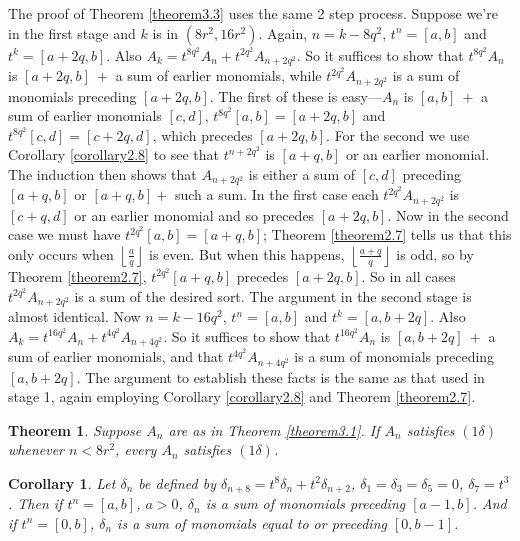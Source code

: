 \documentclass{monsky2009}
\newtheorem{theorem}[definition]{Theorem}
\newtheorem{corollary}[definition]{Corollary}
\begin{document}
The proof of Theorem \ref{theorem3.3} uses the same 2 step process. Suppose we're in the first stage and $k$ is in $(8r^{2}, 16r^{2})$. Again, $n=k-8q^{2}$, $t^{n}=[a,b]$ and $t^{k}=[a+2q, b]$. Also $A_{k}=t^{8q^{2}}A_{n} + t^{2q^{2}}A_{n+2q^{2}}$. So it suffices to show that $t^{8q^{2}}A_{n}$ is $[a+2q,b]\ +$ a sum of earlier monomials, while $t^{2q^{2}}A_{n+2q^{2}}$ is a sum of monomials preceding $[a+2q,b]$. The first of these is easy---$A_{n}$ is $[a,b]\ +$ a sum of earlier monomials $[c,d]$, $t^{8q^{2}}[a,b]=[a+2q,b]$ and $t^{8q^{2}}[c,d]=[c+2q,d]$, which precedes $[a+2q, b]$. For the second we use Corollary \ref{corollary2.8} to see that $t^{n+2q^{2}}$ is $[a+q,b]$ or an earlier monomial. The induction then shows that $A_{n+2q^{2}}$ is either a sum of $[c,d]$ preceding $[a+q,b]$ or $[a+q,b]+$ such a sum. In the first case each $t^{2q^{2}}A_{n+2q^{2}}$ is $[c+q,d]$ or an earlier monomial and so precedes $[a+2q,b]$. Now in the second case we must have $t^{2q^{2}}[a,b]=[a+q,b]$; Theorem \ref{theorem2.7} tells us that this only occurs when $\left\lfloor\frac{a}{q}\right\rfloor$ is even. But when this happens, $\left\lfloor\frac{a+q}{q}\right\rfloor$ is odd, so by Theorem \ref{theorem2.7}, $t^{2q^{2}}[a+q,b]$ precedes $[a+2q,b]$. So in all cases $t^{2q^{2}}A_{n+2q^{2}}$ is a sum of the desired sort. The argument in the second stage is almost identical.  Now $n=k-16q^{2}$, $t^{n}=[a,b]$ and $t^{k}=[a,b+2q]$.  Also $A_{k}=t^{16q^{2}}A_{n}+t^{4q^{2}}A_{n+4q^{2}}$. So it suffices to show that $t^{16q^{2}}A_{n}$ is $[a,b+2q]\ +$ a sum of earlier monomials, and that $t^{4q^{2}}A_{n+4q^{2}}$ is a sum of monomials preceding $[a,b+2q]$. The argument to establish these facts is the same as that used in stage 1, again employing Corollary \ref{corollary2.8} and Theorem \ref{theorem2.7}.

\begin{theorem}
\label{theorem3.5}
Suppose $A_{n}$ are as in Theorem \ref{theorem3.1}. If $A_{n}$ satisfies $(1\delta)$ whenever $n<8r^{2}$, every $A_{n}$ satisfies $(1\delta)$.
\end{theorem}

\begin{corollary}%
\label{corollary3.6}
Let $\delta_{n}$ be defined by $\delta_{n+8}=t^{8}\delta_{n}+t^{2}\delta_{n+2}$, $\delta_{1}=\delta_{3}=\delta_{5}=0$, $\delta_{7}=t^{3}$. Then if $t^{n}=[a,b]$, $a>0$, $\delta_{n}$ is a sum of monomials preceding $[a-1,b]$.  And if $t^{n}=[0,b]$, $\delta_{n}$ is a sum of monomials equal to or preceding $[0,b-1]$.
\end{corollary}
\end{document}
